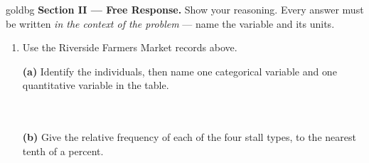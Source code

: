 \documentclass[12pt]{article}
\begin{document}
\begin{enumerate}[leftmargin=1.9em, itemsep=0.13in]
\end{enumerate}

\vspace{0.14in}

\boxguard[18]
\begin{headlinebox}{goldbg}
\small
\textbf{Section II --- Free Response.} Show your reasoning. Every answer must be written
\emph{in the context of the problem} --- name the variable and its units.
\end{headlinebox}

\vspace{0.10in}

\begin{enumerate}[leftmargin=1.9em, itemsep=0.16in, resume]

  \boxguard[16]
  \item Use the Riverside Farmers Market records above.

        \vspace{6pt}
        \textbf{(a)} Identify the individuals, then name one categorical variable and one
        quantitative variable in the table.\\[4pt]
        \\
        \\

        \boxguard[15]
        \vspace{6pt}
        \textbf{(b)} Give the relative frequency of each of the four stall types, to the nearest
        tenth of a percent.\\[4pt]
        \\


\end{enumerate}
\end{document}
